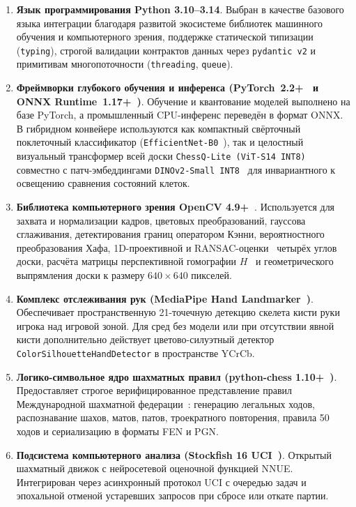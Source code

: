 \begin{enumerate}
    \item \textbf{Язык программирования Python 3.10--3.14}. Выбран в качестве базового языка интеграции благодаря развитой экосистеме библиотек машинного обучения и компьютерного зрения, поддержке статической типизации (\texttt{typing}), строгой валидации контрактов данных через \texttt{pydantic~v2} и примитивам многопоточности (\texttt{threading}, \texttt{queue}).
    \item \textbf{Фреймворки глубокого обучения и инференса (PyTorch~2.2+~\cite{Paszke2019} и ONNX Runtime~1.17+~\cite{ONNXRuntime2021})}. Обучение и квантование моделей выполнено на базе PyTorch, а промышленный CPU-инференс переведён в формат ONNX. В гибридном конвейере используются как компактный свёрточный поклеточный классификатор (\texttt{EfficientNet-B0}~\cite{Wolflein2021}), так и целостный визуальный трансформер всей доски \texttt{ChessQ-Lite (ViT-S14 INT8)}~\cite{Dosovitskiy2021} совместно с патч-эмбеддингами \texttt{DINOv2-Small INT8}~\cite{Oquab2024} для инвариантного к освещению сравнения состояний клеток.
    \item \textbf{Библиотека компьютерного зрения OpenCV 4.9+~\cite{Bradski2000}}. Используется для захвата и нормализации кадров, цветовых преобразований, гауссова сглаживания, детектирования границ оператором Кэнни, вероятностного преобразования Хафа, 1D-проективной и RANSAC-оценки~\cite{Fischler1981} четырёх углов доски, расчёта матрицы перспективной гомографии $H$~\cite{Szeliski2022} и геометрического выпрямления доски к размеру $640 \times 640$ пикселей.
    \item \textbf{Комплекс отслеживания рук (MediaPipe Hand Landmarker~\cite{Lugaresi2019})}. Обеспечивает пространственную 21-точечную детекцию скелета кисти руки игрока над игровой зоной. Для сред без модели или при отсутствии явной кисти дополнительно действует цветово-силуэтный детектор \texttt{ColorSilhouetteHandDetector} в пространстве YCrCb.
    \item \textbf{Логико-символьное ядро шахматных правил (python-chess 1.10+~\cite{Fiekas2024})}. Предоставляет строгое верифицированное представление правил Международной шахматной федерации~\cite{FIDE2023}: генерацию легальных ходов, распознавание шахов, матов, патов, троекратного повторения, правила 50 ходов и сериализацию в форматы FEN и PGN.
    \item \textbf{Подсистема компьютерного анализа (Stockfish 16 UCI~\cite{Romstad2024})}. Открытый шахматный движок с нейросетевой оценочной функцией NNUE. Интегрирован через асинхронный протокол UCI с очередью задач и эпохальной отменой устаревших запросов при сбросе или откате партии.

\end{enumerate}
